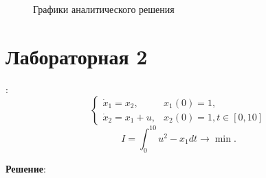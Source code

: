 \documentclass[a4paper, 12pt]{article}
\begin{document}
\begin{figure}[h]
    \noindent{}
    \caption{Графики аналитического решения}
    \label{12end}
\end{figure} 

\section{Лабораторная 2}

{}:
\begin{equation}
    \begin{cases}
        \dot x_1 =x_2, & x_1(0)=1,\\
        \dot x_2=x_1+u,& x_2(0)=1, t \in [0,10]
    \end{cases}
\end{equation}
\begin{equation}
    I=\int_0^{10} u^2 - x_1 dt \rightarrow \min.
\end{equation}

{\bf Решение}:
\end{document}
